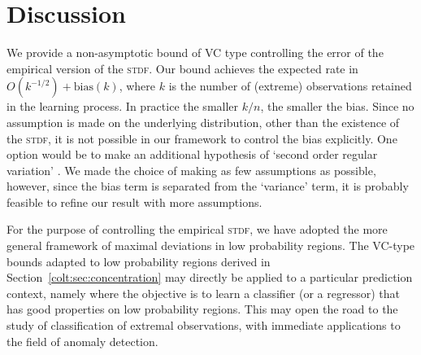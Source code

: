 \section{Discussion}\label{colt:sec:conclusion}

We provide a  non-asymptotic  bound  of VC type controlling 
the error %
of the 
empirical version of the \textsc{stdf}. 
Our bound
achieves the expected rate in $O(k^{-1/2}) + \text{bias}(k)$, where
$k$ is the number of (extreme) observations retained in the learning
process.  %
In practice the smaller  $k/n$,  the smaller  the bias. Since no assumption is made on the underlying distribution, other than the existence of the
\textsc{stdf}, it is not possible in our framework to control the
bias explicitly. One option would be to make an additional hypothesis
of  `second order regular
variation'  \citep[see \emph{e.g.}][]{deHaan1996}. We made the
choice of making as %
few assumptions as possible, however, since the bias term is separated
from the `variance' term, it is probably feasible to refine our result
with more assumptions. 


For the  purpose of controlling the empirical \textsc{stdf}, %
we have adopted the more general framework of maximal deviations in low
probability regions. The VC-type bounds adapted to  low probability regions derived in
Section~\ref{colt:sec:concentration}    
may  directly be applied to a particular prediction context, namely where
the objective is to learn a classifier (or a regressor) that has good properties on
low probability regions.    
This may open the road to the study of classification of  extremal
observations, with immediate applications to the field of anomaly detection.%









